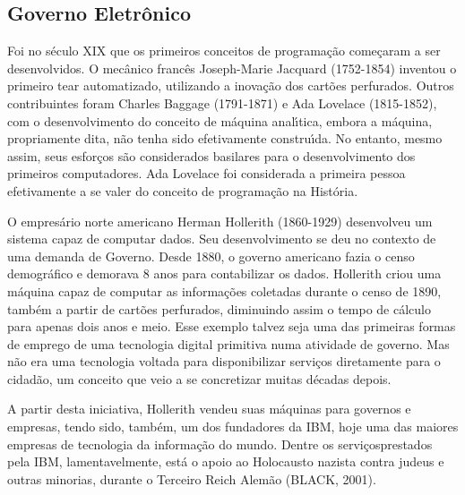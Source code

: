 \documentclass[
12pt,		%
openright,	%
twoside,  %
a4paper,			%
chapter=TITLE,		%
english,			%
french,				%
spanish,			%
brazil				%
]{USPSC-classe/USPSC}
\begin{document}
\subsection[Governo Eletr\^onico]{Governo Eletr\^onico}\label{Governo Eletr\^onico}
Foi no s\'eculo XIX que os primeiros conceitos de programa\c{c}\~ao come\c{c}aram a ser desenvolvidos. O mec\^anico franc\^es Joseph-Marie Jacquard (1752-1854) inventou o primeiro tear automatizado, utilizando a inova\c{c}\~ao dos cart\~oes perfurados. Outros contribuintes foram Charles Baggage (1791-1871) e Ada Lovelace (1815-1852), com o desenvolvimento do conceito de m\'aquina anal\'{\i}tica, embora a m\'aquina, propriamente dita, n\~ao tenha sido efetivamente constru\'{\i}da. No entanto, mesmo assim, seus esfor\c{c}os s\~ao considerados basilares para o desenvolvimento dos primeiros computadores. Ada Lovelace foi considerada a primeira pessoa efetivamente a se valer do conceito de programa\c{c}\~ao na Hist\'oria.

















O empres\'ario norte americano Herman Hollerith (1860-1929) desenvolveu um sistema capaz de computar dados. Seu desenvolvimento se deu no contexto de uma demanda de Governo. Desde 1880, o governo americano fazia o censo demogr\'afico e demorava 8 anos para contabilizar os dados. Hollerith criou uma m\'aquina capaz de computar as informa\c{c}\~oes coletadas durante o censo de 1890, tamb\'em a partir de cart\~oes perfurados, diminuindo assim o tempo de c\'alculo para apenas dois anos e meio. Esse exemplo talvez seja uma das primeiras formas de emprego de uma tecnologia digital primitiva numa atividade de governo. Mas n\~ao era uma tecnologia voltada para disponibilizar servi\c{c}os diretamente para o cidad\~ao, um conceito que veio a se concretizar muitas d\'ecadas depois.

















A partir desta iniciativa, Hollerith vendeu suas m\'aquinas para governos e empresas, tendo sido, tamb\'em, um dos fundadores da IBM, hoje uma das maiores empresas de tecnologia da informa\c{c}\~ao do mundo. Dentre os \textquotedbl servi\c{c}os\textquotedbl  prestados pela IBM, lamentavelmente, est\'a o apoio ao Holocausto nazista contra judeus e outras minorias, durante o Terceiro Reich Alem\~ao  (BLACK, 2001).
\end{document}
